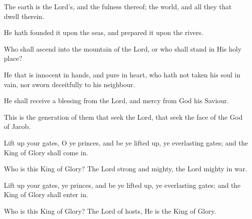The earth is the Lord's, and the fulness thereof; the world, and all they that dwell therein.

He hath founded it upon the seas, and prepared it upon the rivers.

Who shall ascend into the mountain of the Lord, or who shall stand in His holy place?

He that is innocent in hands, and pure in heart, who hath not taken his soul in vain, nor sworn deceitfully to his neighbour.

He shall receive a blessing from the Lord, and mercy from God his Saviour.

This is the generation of them that seek the Lord, that seek the face of the God of Jacob.

Lift up your gates, O ye princes, and be ye lifted up, ye everlasting gates; and the King of Glory shall come in.

Who is this King of Glory? The Lord strong and mighty, the Lord mighty in war.

Lift up your gates, ye princes, and be ye lifted up, ye everlasting gates; and the King of Glory shall enter in.

Who is this King of Glory? The Lord of hosts, He is the King of Glory.
